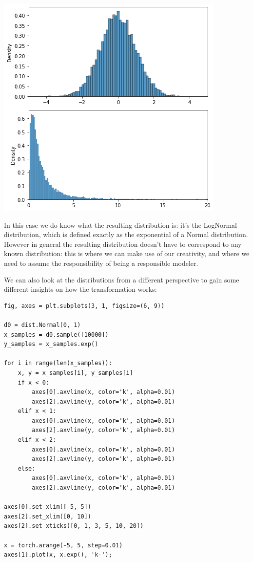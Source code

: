 \documentclass[11pt]{article}
\begin{document}
\begin{center}
\includegraphics[width=.9\linewidth]{./.ob-jupyter/1367594e276ee8e864c489e0229ae01fb8100d18.png}
\end{center}

In this case we do know what the resulting distribution is: it's the LogNormal distribution, which is defined exactly as the exponential of a Normal distribution. However in general the resulting distribution doesn't have to correspond to any known distribution: this is where we can make use of our creativity, and where we need to assume the responsibility of being a responsible modeler.

We can also look at the distributions from a different perspective to gain some different insights on how the transformation works:

\begin{verbatim}
fig, axes = plt.subplots(3, 1, figsize=(6, 9))

d0 = dist.Normal(0, 1)
x_samples = d0.sample([10000])
y_samples = x_samples.exp()

for i in range(len(x_samples)):
    x, y = x_samples[i], y_samples[i]
    if x < 0:
        axes[0].axvline(x, color='k', alpha=0.01)
        axes[2].axvline(y, color='k', alpha=0.01)
    elif x < 1:
        axes[0].axvline(x, color='k', alpha=0.01)
        axes[2].axvline(y, color='k', alpha=0.01)
    elif x < 2:
        axes[0].axvline(x, color='k', alpha=0.01)
        axes[2].axvline(y, color='k', alpha=0.01)
    else:
        axes[0].axvline(x, color='k', alpha=0.01)
        axes[2].axvline(y, color='k', alpha=0.01)

axes[0].set_xlim([-5, 5])
axes[2].set_xlim([0, 10])
axes[2].set_xticks([0, 1, 3, 5, 10, 20])

x = torch.arange(-5, 5, step=0.01)
axes[1].plot(x, x.exp(), 'k-');
\end{verbatim}
\end{document}
